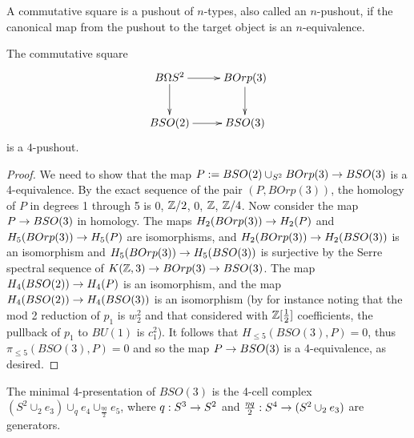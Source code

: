 \documentclass{amsart}
\begin{document}
\begin{definition}
A commutative square is a pushout of $n$-types, also called an $n$-pushout, if the canonical map from the pushout to the target object is an $n$-equivalence.
\end{definition}

\begin{proposition}
\label{s2pushout}
The commutative square
\[
\vcenter{\hbox{\xymatrix{
B\Omega S^2 \ar[r] \ar[d] & BOrp(3) \ar[d] \\
BSO(2) \ar[r] & BSO(3)
}}}
\]
is a $4$-pushout.
\end{proposition}
\begin{proof}
We need to show that the map $P := BSO(2) \cup_{S^2} BOrp(3) \rightarrow BSO(3)$ is a 4-equivalence.  By the exact sequence of the pair $(P, BOrp(3))$, the homology of $P$ in degrees 1 through 5 is $0$, $\mathbb Z/2$, $0$, $\mathbb Z$, $\mathbb Z/4$.  Now consider the map $P \rightarrow BSO(3)$ in homology.  The maps $H_2(BOrp(3)) \rightarrow H_2(P)$ and $H_5(BOrp(3)) \rightarrow H_5(P)$ are isomorphisms, and $H_2(BOrp(3)) \rightarrow H_2(BSO(3))$ is an isomorphism and $H_5(BOrp(3)) \rightarrow H_5(BSO(3))$ is surjective by the Serre spectral sequence of $K(\mathbb Z,3) \rightarrow BOrp(3) \rightarrow BSO(3)$.  The map $H_4(BSO(2)) \rightarrow H_4(P)$ is an isomorphism, and the map $H_4(BSO(2)) \rightarrow H_4(BSO(3))$ is an isomorphism (by for instance noting that the mod 2 reduction of $p_1$ is $w_2^2$ and that considered with $\mathbb Z[\frac{1}{2}]$ coefficients, the pullback of $p_1$ to $BU(1)$ is $c_1^2$).  It follows that $H_{\leq 5}(BSO(3),P) = 0$, thus $\pi_{\leq 5}(BSO(3),P) = 0$ and so the map $P \rightarrow BSO(3)$ is a 4-equivalence, as desired.
\end{proof}


\begin{corollary}
\label{cor-bso3trunc}
The minimal 4-presentation of $BSO(3)$ is the 4-cell complex $(S^2 \cup_2 e_3) \cup_q e_4 \cup_{\frac{\eta q}{2}} e_5$, where $q: S^3 \rightarrow S^2$ and $\frac{\eta q}{2}: S^4 \rightarrow (S^2 \cup_2 e_3)$ are generators.
\end{corollary}
\end{document}
